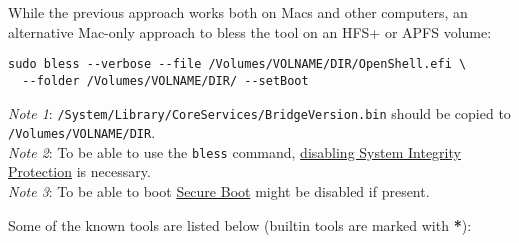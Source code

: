 \documentclass[]{article}
\begin{document}
While the previous approach works both on Macs and other computers,
an alternative Mac-only approach to bless the tool on an HFS+ or APFS
volume:

\begin{lstlisting}[caption=Blessing tool, label=blesstool, style=ocbash]
sudo bless --verbose --file /Volumes/VOLNAME/DIR/OpenShell.efi \
  --folder /Volumes/VOLNAME/DIR/ --setBoot
\end{lstlisting}

\emph{Note 1}: \texttt{/System/Library/CoreServices/BridgeVersion.bin} should be copied
  to \texttt{/Volumes/VOLNAME/DIR}. \\
\emph{Note 2}: To be able to use the \texttt{bless} command,
  \href{https://developer.apple.com/library/archive/documentation/Security/Conceptual/System_Integrity_Protection_Guide/ConfiguringSystemIntegrityProtection/ConfiguringSystemIntegrityProtection.html}{disabling System Integrity Protection} is necessary. \\
\emph{Note 3}: To be able to boot \href{https://support.apple.com/HT208330}{Secure Boot}
  might be disabled if present.

Some of the known tools are listed below (builtin tools are marked with \textbf{*}):
\end{document}
